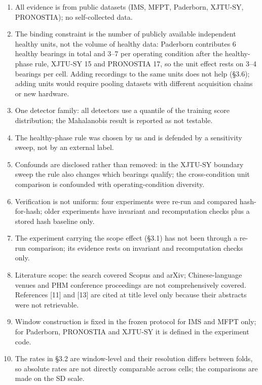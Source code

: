 \documentclass[11pt]{article}
\begin{document}
\begin{enumerate}
  \item All evidence is from public datasets (IMS, MFPT, Paderborn, XJTU-SY, PRONOSTIA); no self-collected data.
  \item The binding constraint is the number of publicly available independent healthy units, not the volume of healthy data: Paderborn contributes 6 healthy bearings in total and 3--7 per operating condition after the healthy-phase rule, XJTU-SY 15 and PRONOSTIA 17, so the unit effect rests on 3--4 bearings per cell. Adding recordings to the same units does not help (\S3.6); adding units would require pooling datasets with different acquisition chains or new hardware.
  \item One detector family: all detectors use a quantile of the training score distribution; the Mahalanobis result is reported as not testable.
  \item The healthy-phase rule was chosen by us and is defended by a sensitivity sweep, not by an external label.
  \item Confounds are disclosed rather than removed: in the XJTU-SY boundary sweep the rule also changes which bearings qualify; the cross-condition unit comparison is confounded with operating-condition diversity.
  \item Verification is not uniform: four experiments were re-run and compared hash-for-hash; older experiments have invariant and recomputation checks plus a stored hash baseline only.
  \item The experiment carrying the scope effect (\S3.1) has not been through a re-run comparison; its evidence rests on invariant and recomputation checks only.
  \item Literature scope: the search covered Scopus and arXiv; Chinese-language venues and PHM conference proceedings are not comprehensively covered. References [11] and [13] are cited at title level only because their abstracts were not retrievable.
  \item Window construction is fixed in the frozen protocol for IMS and MFPT only; for Paderborn, PRONOSTIA and XJTU-SY it is defined in the experiment code.
  \item The rates in \S3.2 are window-level and their resolution differs between folds, so absolute rates are not directly comparable across cells; the comparisons are made on the SD scale.
\end{enumerate}
\end{document}
